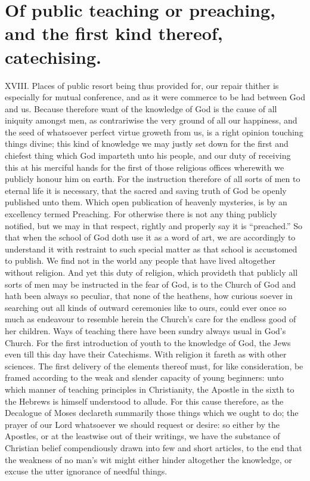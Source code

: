 \section*{Of public teaching or preaching, and the first kind thereof, catechising.}
XVIII. Places of public resort being thus provided for, our repair thither is especially for mutual conference, and as it were commerce to be had between God and us.
Because therefore want of the knowledge of God is the cause of all iniquity amongst men, as contrariwise the very ground of all our happiness, and the seed of whatsoever  perfect virtue groweth from us, is a right opinion touching things divine; this kind of knowledge we may justly set down for the first and chiefest thing which God imparteth unto his people, and our duty of receiving this at his merciful hands for the first of those religious offices wherewith we publicly honour him on earth. For the instruction therefore of all sorts of men to eternal life it is necessary, that the sacred and saving truth of God be openly published unto them. Which open publication of heavenly mysteries, is by an excellency termed Preaching. For otherwise there is not any thing publicly notified, but we may in that respect, rightly and properly say it is “preached.” So that when the school of God doth use it as a word of art, we are accordingly to understand it with restraint to such special matter as that school is accustomed to publish.
We find not in the world any people that have lived altogether without religion. And yet this duty of religion, which provideth that publicly all sorts of men may be instructed in the fear of God, is to the Church of God and hath been always so peculiar, that none of the heathens, how curious soever in searching out all kinds of outward ceremonies like to ours, could ever once so much as endeavour to resemble herein the Church’s care for the endless good of her children.
Ways of teaching there have been sundry always usual in God’s Church. For the first introduction of youth to the knowledge of God, the Jews even till this day have their Catechisms. With religion it fareth as with other sciences.  The first delivery of the elements thereof must, for like consideration, be framed according to the weak and slender capacity of young beginners: unto which manner of teaching principles in Christianity, the Apostle in the sixth to the Hebrews is himself understood to allude. For this cause therefore, as the Decalogue of Moses declareth summarily those things which we ought to do; the prayer of our Lord whatsoever we should request or desire: so either by the Apostles, or at the leastwise out of their writings, we have the substance of Christian belief compendiously drawn into few and short articles, to the end that the weakness of no man’s wit might either hinder altogether the knowledge, or excuse the utter ignorance of needful things.
